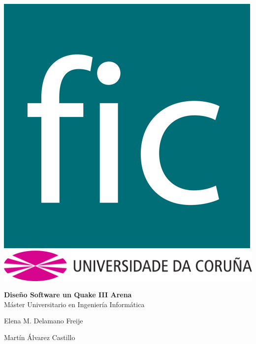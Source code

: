 \documentclass[a4paper,12pt]{report}
\begin{document}
	
	\pagestyle{empty}
	\begin{titlepage}
		\begin{center}
			\includegraphics[scale=0.15]{images/fic01.png} \\ 
			\vspace{2cm} \includegraphics[scale=.4]{images/udc.pdf} \\
			
			
			\vspace{2.5cm}
			
			\textbf{\Large Diseño Software un Quake III Arena}\\
			\vspace{0.5cm}
			\large{Máster Universitario en Ingeniería Informática}\\
		\end{center}
		
		\vspace{7.2cm}
		\begin{flushright}
			\noindent Elena M. Delamano Freije
			
			\noindent Martín Álvarez Castillo
			
		\end{flushright}
	\end{titlepage}
	\clearpage
	
\end{document}
